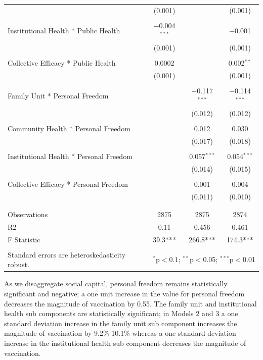 \documentclass[
]{article}
\begin{document}
\begin{table}[!htbp]
\begin{tabular}{@{\extracolsep{5pt}}lccc}
  & (0.001) &  & (0.001) \\ 
  & & & \\ 
 Institutional Health * Public Health & $-$0.004$^{***}$ &  & $-$0.001 \\ 
  & (0.001) &  & (0.001) \\ 
  & & & \\ 
 Collective Efficacy * Public Health & 0.0002 &  & 0.002$^{**}$ \\ 
  & (0.001) &  & (0.001) \\ 
  & & & \\ 
 Family Unit * Personal Freedom &  & $-$0.117$^{***}$ & $-$0.114$^{***}$ \\ 
  &  & (0.012) & (0.012) \\ 
  & & & \\ 
 Community Health * Personal Freedom &  & 0.012 & 0.030 \\ 
  &  & (0.017) & (0.018) \\ 
  & & & \\ 
 Institutional Health * Personal Freedom &  & 0.057$^{***}$ & 0.054$^{***}$ \\ 
  &  & (0.014) & (0.015) \\ 
  & & & \\ 
 Collective Efficacy * Personal Freedom &  & 0.001 & 0.004 \\ 
  &  & (0.011) & (0.010) \\ 
  & & & \\ 
\hline \\[-1.8ex] 
Observations & 2875 & 2875 & 2874 \\ 
R2 & 0.11 & 0.456 & 0.461 \\ 
F Statistic & 39.3*** & 266.8*** & 174.3*** \\ 
\hline 
\hline \\[-1.8ex] 
Standard errors are heteroskedasticity robust. & \multicolumn{3}{r}{$^{*}$p$<$0.1; $^{**}$p$<$0.05; $^{***}$p$<$0.01} \\ 
\end{tabular} 
\end{table}

As we disaggregate social capital, personal freedom remains
statistically significant and negative; a one unit increase in the value
for personal freedom decreases the magnitude of vaccination by 0.55. The
family unit and institutional health sub components are statistically
significant; in Models 2 and 3 a one standard deviation increase in the
family unit sub component increases the magnitude of vaccination by
9.2\%-10.1\% whereas a one standard deviation increase in the
institutional health sub component decreases the magnitude of
vaccination.
\end{document}
